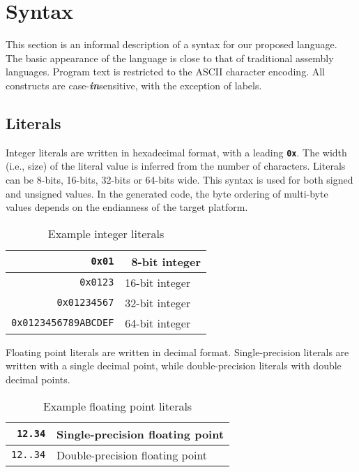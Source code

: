 \section{Syntax}

This section is an informal description
of a syntax for our proposed language.
The basic appearance of the language is close
to that of traditional assembly languages.
Program text is restricted to the ASCII
character encoding. All constructs are case-\emph{\textbf{in}}sensitive,
with the exception of labels.

\subsection{Literals}

Integer literals are written in hexadecimal format, with a leading
\textbf{\texttt{0x}}. The width (i.e., size) of the literal value is
inferred from the number of characters. Literals can be 8-bits, 16-bits,
32-bits or 64-bits wide. This syntax is used for both signed and unsigned values.
In the generated code, the byte ordering of multi-byte values depends on
the endianness of the target platform.

\begin{table}[h!]
  \begin{center}
    \begin{tabular}{|r|l|}
      \hline
      \texttt{0x01}               & \ 8-bit integer  \\ \hline
      \texttt{0x0123}             &   16-bit integer \\ \hline
      \texttt{0x01234567}         &   32-bit integer \\ \hline
      \texttt{0x0123456789ABCDEF} &   64-bit integer \\ \hline
    \end{tabular}
  \end{center}
  \caption{Example integer literals}
\end{table}

Floating point literals are written in decimal format. Single-precision literals
are written with a single decimal point, while double-precision
literals with double decimal points.

\begin{table}[h!]
  \begin{center}
    \begin{tabular}{|r|l|}
      \hline
      \texttt{12.34}  & Single-precision floating point \\ \hline
      \texttt{12..34} & Double-precision floating point \\ \hline
    \end{tabular}
  \end{center}
  \caption{Example floating point literals}
\end{table}

